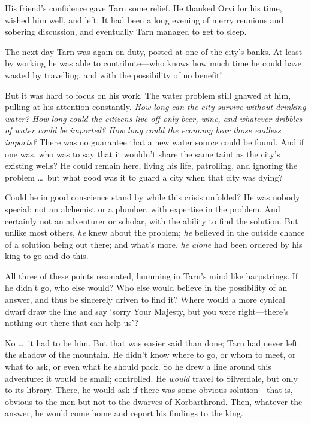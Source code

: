 His friend's confidence gave Tarn some relief.  He thanked Orvi for his time, wished him well, and left.  It had been a long evening of merry reunions and sobering discussion, and eventually Tarn managed to get to sleep.

The next day Tarn was again on duty, posted at one of the city's banks.  At least by working he was able to contribute---who knows how much time he could have wasted by travelling, and with the possibility of no benefit!

But it was hard to focus on his work.  The water problem still gnawed at him, pulling at his attention constantly.  \emph{How long can the city survive without drinking water?  How long could the citizens live off only beer, wine, and whatever dribbles of water could be imported?  How long could the economy bear those endless imports?}  There was no guarantee that a new water source could be found.  And if one was, who was to say that it wouldn't share the same taint as the city's existing wells?  He could remain here, living his life, patrolling, and ignoring the problem \ldots\ but what good was it to guard a city when that city was dying?

Could he in good conscience stand by while this crisis unfolded?  He was nobody special; not an alchemist or a plumber, with expertise in the problem.  And certainly not an adventurer or scholar, with the ability to find the solution. But unlike most others, \emph{he} knew about the problem; \emph{he} believed in the outside chance of a solution being out there; and what's more, \emph{he alone} had been ordered by his king to go and do this.

All three of these points resonated, humming in Tarn's mind like harpstrings.  If he didn't go, who else would?  Who else would believe in the possibility of an answer, and thus be sincerely driven to find it?  Where would a more cynical dwarf draw the line and say `sorry Your Majesty, but you were right---there's nothing out there that can help us'?

No \ldots\ it had to be him.  But that was easier said than done; Tarn had never left the shadow of the mountain.  He didn't know where to go, or whom to meet, or what to ask, or even what he should pack.  So he drew a line around this adventure: it would be small; controlled.  He \emph{would} travel to Silverdale, but only to its library.  There, he would ask if there was some obvious solution---that is, obvious to the men but not to the dwarves of Korbarthrond.  Then, whatever the answer, he would come home and report his findings to the king.

